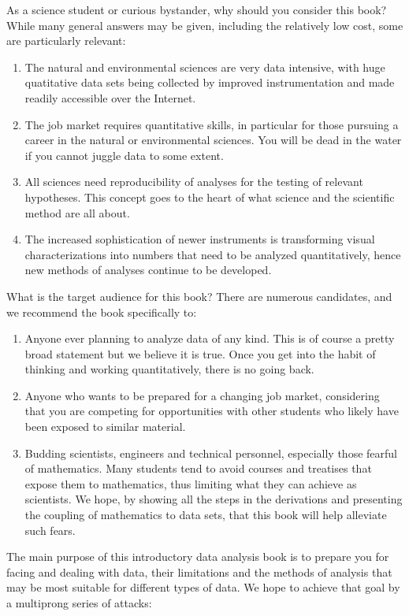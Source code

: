 As a science student or curious bystander, why should you consider this book?  While many
general answers may be given, including the relatively low cost, some are particularly relevant:

\begin{enumerate}
\item The natural and environmental sciences are very data intensive, with huge quatitative data sets being collected 
  by improved instrumentation and made readily accessible over the Internet.  
\item The job market requires quantitative skills, in particular for those pursuing a career in the natural 
  or environmental sciences.  You will be dead in the water if you cannot juggle data to some extent.
\item All sciences need reproducibility of analyses for the testing of relevant hypotheses.
   This concept goes to the heart of what science and the scientific method are all about.
\item The increased sophistication of newer instruments is transforming visual
   characterizations into numbers that need to be analyzed quantitatively, hence new methods of analyses
   continue to be developed.
\end{enumerate}

What is the target audience for this book?  There are numerous candidates,
and we recommend the book specifically to:

\begin{enumerate}
\item Anyone ever planning to analyze data of any kind. This is of course a pretty broad statement but we believe it is true.
   Once you get into the habit of thinking and working quantitatively, there is no going back.
\item Anyone who wants to be prepared for a changing job market, considering that you are competing for
   opportunities with other students who likely have been exposed to similar material.
\item Budding scientists, engineers and technical personnel, especially those fearful of mathematics. Many students
   tend to avoid courses and treatises that expose them to mathematics, thus limiting what they
   can achieve as scientists.  We hope, by showing all the steps in the derivations and presenting the coupling of
   mathematics to data sets, that this book will help alleviate such fears.
\end{enumerate}

The main purpose of this introductory data analysis book is to prepare you for facing and dealing with data, their limitations and
the methods of analysis that may be most suitable for different types of data.  We hope to achieve that goal by
a multiprong series of attacks:

